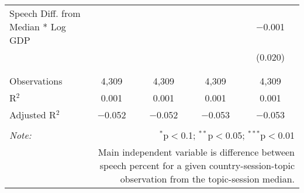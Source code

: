 \begin{table}[!htbp]
\begin{tabular}{@{\extracolsep{5pt}}lcccc}
 Speech Diff. from Median * Log GDP &  &  &  & $-$0.001 \\ 
  &  &  &  & (0.020) \\ 
  & & & & \\ 
\hline \\[-1.8ex] 
Observations & 4,309 & 4,309 & 4,309 & 4,309 \\ 
R$^{2}$ & 0.001 & 0.001 & 0.001 & 0.001 \\ 
Adjusted R$^{2}$ & $-$0.052 & $-$0.052 & $-$0.053 & $-$0.053 \\ 
\hline 
\hline \\[-1.8ex] 
\textit{Note:}  & \multicolumn{4}{r}{$^{*}$p$<$0.1; $^{**}$p$<$0.05; $^{***}$p$<$0.01} \\ 
 & \multicolumn{4}{r}{Main independent variable is difference between speech percent for a given country-session-topic observation from the topic-session median.} \\ 
\end{tabular} 
\end{table} 
